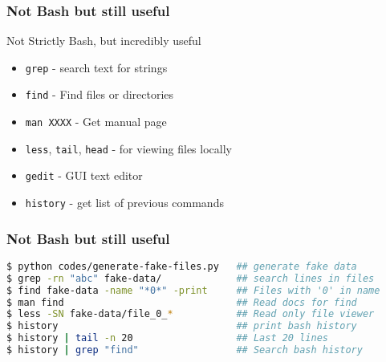 \documentclass{beamer}
\newcommand{\code}[1]{\colorbox{codegray}{\texttt{#1}}}
\begin{document}




\begin{frame}
\frametitle{Not Bash but still useful}
Not Strictly Bash, but incredibly useful 
\begin{itemize}
    \item \code{grep} - search text for strings
    \pause
    \item \code{find}   - Find files or directories
    \pause
    \item \code{man XXXX} - Get manual page
    \pause
    \item \code{less}, \code{tail}, \code{head} - for viewing files locally 
    \pause
    \item \code{gedit} - GUI text editor
    \pause
    \item \code{history} - get list of previous commands
\end{itemize}
\end{frame}


\begin{frame}[fragile]
\frametitle{Not Bash but still useful}
\begingroup
\scriptsize
\begin{lstlisting}[backgroundcolor = \color{codegray}, language = Bash, showstringspaces=false]
$ python codes/generate-fake-files.py   ## generate fake data
$ grep -rn "abc" fake-data/             ## search lines in files 
$ find fake-data -name "*0*" -print     ## Files with '0' in name
$ man find                              ## Read docs for find
$ less -SN fake-data/file_0_*           ## Read only file viewer
$ history                               ## print bash history 
$ history | tail -n 20                  ## Last 20 lines 
$ history | grep "find"                 ## Search bash history
\end{lstlisting}
\endgroup
\end{frame}
\end{document}
